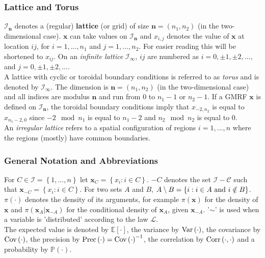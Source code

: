 \documentclass[12pt]{book}
\begin{document}
\subsubsection*{Lattice and Torus}
$\mathcal{I}_{\pmb{n}}$ denotes a (regular) \textbf{lattice} (or grid) of size $\pmb{n}=\left(n_1, n_2\right)$ (in the two-dimensional case). $\pmb{x}$ can take values on $\mathcal{I}_{\pmb{n}}$ and $x_{i,j}$ denotes the value of $\pmb{x}$ at location $ij$, for $i=1,...,n_1$ and $j=1,...,n_2$. For easier reading this will be shortened to $x_{ij}$. On an \textit{infinite lattice} $\mathcal{I}_{\pmb{\infty}}$, $ij$ are numbered as $i=0,\pm1,\pm2,...,$ and $j=0,\pm1,\pm2,...$. \\
A lattice with cyclic or toroidal boundary conditions is referred to as \textit{torus} and is denoted by $\mathcal{I}_{\pmb{\infty}}$. The dimension is $\pmb{n}=\left(n_1,n_2\right)$ (in the two-dimensional case) and all indices are modulus $\pmb{n}$ and run from 0 to $n_1-1$ or $n_2-1$. If a GMRF $\pmb{x}$ is defined on $\mathcal{I}_{\pmb{n}}$, the toroidal boundary conditions imply that $x_{-2,n_2}$ is equal to $x_{n_1-2,0}$ since $-2\mod n_1$ is equal to $n_1-2$ and $n_2\mod n_2$ is equal to 0.\\
An \textit{irregular lattice} refers to a spatial configuration of regions $i=1,...,n$ where the regions (mostly) have common boundaries.
\subsubsection*{General Notation and Abbreviations}
For $C\in\mathcal{I}=\left\lbrace1,...,n\right\rbrace$ let $\pmb{x}_C=\left\lbrace x_i:i\in C\right\rbrace$. $-C$ denotes the set $\mathcal{I-C}$ such that $\pmb{x}_{-C}=\left\lbrace x_i:i\in C\right\rbrace$. For two sets $A$ and $B$, $A\setminus B=\left\lbrace i:i\in A \hbox{ and } i \notin B\right\rbrace$. \\
$\pi\left(\cdot\right)$ denotes the density of its arguments, for example $\pi\left(\pmb{x}\right)$ for the density of $\pmb{x}$ and $\pi\left(\pmb{x}_A|\pmb{x}_{-A}\right)$ for the conditional density of $\pmb{x}_A$, given $\pmb{x}_{-A}$. '$\sim$' is used when a variable is 'distributed' according to the law $\mathcal{L}$.  \\
The expected value is denoted by $\mathbb{E}\left[\cdot\right]$, the variance by $\hbox{Var}\left(\cdot\right)$, the covariance by $\hbox{Cov}\left(\cdot\right)$, the precision by $\hbox{Prec}\left(\cdot\right)=\hbox{Cov}\left(\cdot\right)^{-1}$, the correlation by $\hbox{Corr}\left(\cdot,\cdot\right)$ and a probability by $\mathbb{P}\left(\cdot\right)$.
\end{document}
